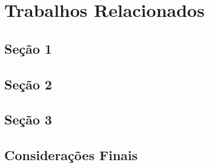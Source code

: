 \chapter{Trabalhos Relacionados}

\section{Seção 1}

\lipsum

\section{Seção 2}

\lipsum

\section{Seção 3}

\lipsum

\section{Considerações Finais}

\lipsum